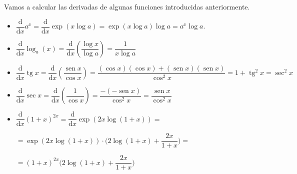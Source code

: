 \begin{ejemplo}
Vamos a calcular las derivadas de algunas funciones introducidas anteriormente.
\begin{itemize}
\item
$\dfrac{\mathrm{d}}{\mathrm{d}x}a^x = \dfrac{\mathrm{d}}{\mathrm{d}x}\exp(x\log a)=\exp(x\log a)\log a=a^x\log a$.

\item
$\dfrac{\mathrm{d}}{\mathrm{d}x}\log_a(x) =\dfrac{\mathrm{d}}{\mathrm{d}x}\left(\dfrac{\log x}{\log a}\right)=\dfrac1{x\log a}$

\item
$\dfrac{\mathrm{d}}{\mathrm{d}x}\operatorname{tg} x=\dfrac{\mathrm{d}}{\mathrm{d}x}\left(\dfrac{\operatorname{sen} x}{\cos x}\right)
=\dfrac{(\cos x)(\cos x)+(\operatorname{sen} x)(\operatorname{sen} x)}{\cos^2 x}=1+\operatorname{tg}^2x=\sec^2x$

\item
$\dfrac{\mathrm{d}}{\mathrm{d}x}\sec x=\dfrac{\mathrm{d}}{\mathrm{d}x}\left(\dfrac{1}{\cos x}\right)
=\dfrac{-(-\operatorname{sen} x)}{\cos^2 x}=\dfrac{\operatorname{sen} x}{\cos^2 x}$


%

\item
$\dfrac{\mathrm{d}}{\mathrm{d}x}(1+x)^{2x}=\dfrac{\mathrm{d}}{\mathrm{d}x}\exp(2x\log(1+x))=$\newline
\rule{0pt}{0pt}\hfill$=\exp(2x\log(1+x))\cdot\Big(2\log(1+x)+\dfrac{2x}{1+x}\Big)
=$\hfill\rule{0pt}{0pt}\newline
\rule{0pt}{0pt}\hfill$=(1+x)^{2x}\Big(2\log(1+x)+\dfrac{2x}{1+x}\Big)$


\end{itemize}
\end{ejemplo}
